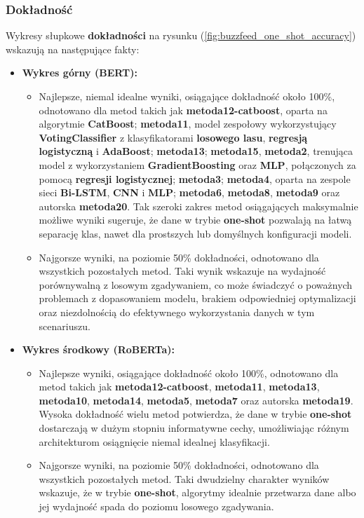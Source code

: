 \subsubsection{Dokładność}
Wykresy słupkowe \textbf{dokładności} na rysunku (\ref{fig:buzzfeed_one_shot_accuracy}) wskazują na następujące fakty:
\begin{itemize}
	\item \textbf{Wykres górny (BERT):}
	      \begin{itemize}
		      \item Najlepsze, niemal idealne wyniki, osiągające dokładność około 100\%, odnotowano dla metod takich jak \textbf{metoda12-catboost}, oparta na algorytmie \textbf{CatBoost}; \textbf{metoda11}, model zespołowy wykorzystujący \textbf{VotingClassifier} z klasyfikatorami \textbf{losowego lasu}, \textbf{regresją logistyczną} i \textbf{AdaBoost}; \textbf{metoda13}; \textbf{metoda15}, \textbf{metoda2}, trenująca model z wykorzystaniem \textbf{GradientBoosting} oraz \textbf{MLP}, połączonych za pomocą \textbf{regresji logistycznej}; \textbf{metoda3}; \textbf{metoda4}, oparta na zespole sieci \textbf{Bi-LSTM}, \textbf{CNN} i \textbf{MLP}; \textbf{metoda6}, \textbf{metoda8}, \textbf{metoda9} oraz autorska \textbf{metoda20}. Tak szeroki zakres metod osiągających maksymalnie możliwe wyniki sugeruje, że dane w trybie \textbf{one-shot} pozwalają na łatwą separację klas, nawet dla prostszych lub domyślnych konfiguracji modeli.
		      \item Najgorsze wyniki, na poziomie 50\% dokładności, odnotowano dla wszystkich pozostałych metod. Taki wynik wskazuje na wydajność porównywalną z losowym zgadywaniem, co może świadczyć o poważnych problemach z dopasowaniem modelu, brakiem odpowiedniej optymalizacji oraz niezdolnością do efektywnego wykorzystania danych w tym scenariuszu.
	      \end{itemize}

	\item \textbf{Wykres środkowy (RoBERTa):}
	      \begin{itemize}
		      \item Najlepsze wyniki, osiągające dokładność około 100\%, odnotowano dla metod takich jak \textbf{metoda12-catboost}, \textbf{metoda11}, \textbf{metoda13}, \textbf{metoda10}, \textbf{metoda14}, \textbf{metoda5}, \textbf{metoda7} oraz autorska \textbf{metoda19}. Wysoka dokładność wielu metod potwierdza, że dane w trybie \textbf{one-shot} dostarczają w dużym stopniu informatywne cechy, umożliwiając różnym architekturom osiągnięcie niemal idealnej klasyfikacji.
		      \item Najgorsze wyniki, na poziomie 50\% dokładności, odnotowano dla wszystkich pozostałych metod. Taki dwudzielny charakter wyników wskazuje, że w trybie \textbf{one-shot}, algorytmy idealnie przetwarza dane albo jej wydajność spada do poziomu losowego zgadywania.
	      \end{itemize}


\end{itemize}
